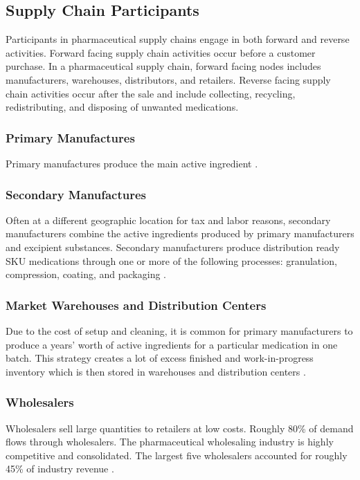 \documentclass[sigconf]{acmart}
\begin{document}
\subsection{Supply Chain Participants}
Participants in pharmaceutical supply chains engage in both forward and reverse activities. Forward facing supply chain activities occur before a customer purchase. In a pharmaceutical supply chain, forward facing nodes includes manufacturers, warehouses, distributors, and retailers. Reverse facing supply chain activities occur after the sale and include collecting, recycling, redistributing, and disposing of unwanted medications.  

\subsubsection{Primary Manufactures} Primary manufactures produce the main active ingredient \cite{Shah01}.

\subsubsection{Secondary Manufactures} Often at a different geographic location for tax and labor reasons, secondary manufacturers combine the active ingredients produced by primary manufacturers and excipient substances. Secondary manufacturers produce distribution ready SKU medications through one or more of the following processes: granulation, compression, coating, and packaging \cite{Shah01}.

\subsubsection{Market Warehouses and Distribution Centers} Due to the cost of setup and cleaning, it is common for primary manufacturers to produce a years' worth of active ingredients for a particular medication in one batch. This strategy creates a lot of excess finished and work-in-progress inventory which is then stored in warehouses and distribution centers \cite{Shah01}.

\subsubsection{Wholesalers} Wholesalers sell large quantities to retailers at low costs. Roughly 80\% of demand flows through wholesalers. The pharmaceutical wholesaling industry is highly competitive and consolidated. The largest five wholesalers accounted for roughly 45\% of industry revenue \cite{Shah01} \cite{Hoovers01}. 
\end{document}
